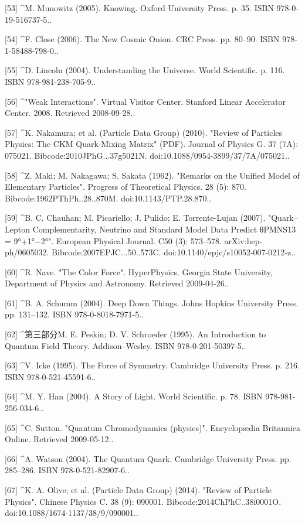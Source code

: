 [53]
^M. Munowitz (2005). Knowing. Oxford University Press. p. 35. ISBN 978-0-19-516737-5..

[54]
^F. Close (2006). The New Cosmic Onion. CRC Press. pp. 80–90. ISBN 978-1-58488-798-0..

[55]
^D. Lincoln (2004). Understanding the Universe. World Scientific. p. 116. ISBN 978-981-238-705-9..

[56]
^"Weak Interactions". Virtual Visitor Center. Stanford Linear Accelerator Center. 2008. Retrieved 2008-09-28..

[57]
^K. Nakamura; et al. (Particle Data Group) (2010). "Review of Particles Physics: The CKM Quark-Mixing Matrix" (PDF). Journal of Physics G. 37 (7A): 075021. Bibcode:2010JPhG...37g5021N. doi:10.1088/0954-3899/37/7A/075021..

[58]
^Z. Maki; M. Nakagawa; S. Sakata (1962). "Remarks on the Unified Model of Elementary Particles". Progress of Theoretical Physics. 28 (5): 870. Bibcode:1962PThPh..28..870M. doi:10.1143/PTP.28.870..

[59]
^B. C. Chauhan; M. Picariello; J. Pulido; E. Torrente-Lujan (2007). "Quark–Lepton Complementarity, Neutrino and Standard Model Data Predict θPMNS13 = 9°+1°−2°". European Physical Journal. C50 (3): 573–578. arXiv:hep-ph/0605032. Bibcode:2007EPJC...50..573C. doi:10.1140/epjc/s10052-007-0212-z..

[60]
^R. Nave. "The Color Force". HyperPhysics. Georgia State University, Department of Physics and Astronomy. Retrieved 2009-04-26..

[61]
^B. A. Schumm (2004). Deep Down Things. Johns Hopkins University Press. pp. 131–132. ISBN 978-0-8018-7971-5..

[62]
^第三部分M. E. Peskin; D. V. Schroeder (1995). An Introduction to Quantum Field Theory. Addison–Wesley. ISBN 978-0-201-50397-5..

[63]
^V. Icke (1995). The Force of Symmetry. Cambridge University Press. p. 216. ISBN 978-0-521-45591-6..

[64]
^M. Y. Han (2004). A Story of Light. World Scientific. p. 78. ISBN 978-981-256-034-6..

[65]
^C. Sutton. "Quantum Chromodynamics (physics)". Encyclopædia Britannica Online. Retrieved 2009-05-12..

[66]
^A. Watson (2004). The Quantum Quark. Cambridge University Press. pp. 285–286. ISBN 978-0-521-82907-6..

[67]
^K. A. Olive; et al. (Particle Data Group) (2014). "Review of Particle Physics". Chinese Physics C. 38 (9): 090001. Bibcode:2014ChPhC..38i0001O. doi:10.1088/1674-1137/38/9/090001..

